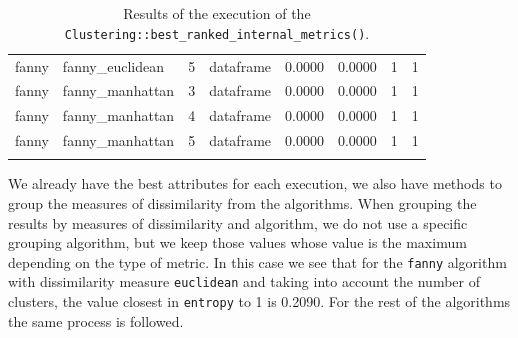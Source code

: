 {\begin{longtable}{| p{1cm} | p{1.8cm} | p{0.9cm} | p{1.1cm} | p{1.6cm} | p{0.8cm} | p{1.3cm} | p{1.8cm} |}
\scriptsize   fanny    & \scriptsize fanny\_euclidean & \scriptsize    5     & \scriptsize dataframe & \scriptsize    0.0000    & \scriptsize 0.0000 & \scriptsize    1     & \scriptsize        1 \\
\cline{2-8}
\scriptsize   fanny    & \scriptsize fanny\_manhattan & \scriptsize    3     & \scriptsize dataframe & \scriptsize    0.0000    & \scriptsize 0.0000 & \scriptsize    1     & \scriptsize        1 \\
\scriptsize   fanny    & \scriptsize fanny\_manhattan & \scriptsize    4     & \scriptsize dataframe & \scriptsize    0.0000    & \scriptsize 0.0000 & \scriptsize    1     & \scriptsize        1 \\
\scriptsize   fanny    & \scriptsize fanny\_manhattan & \scriptsize    5     & \scriptsize dataframe & \scriptsize    0.0000    & \scriptsize 0.0000 & \scriptsize    1     & \scriptsize        1 \\
\hline
\caption{Results of the execution of the \texttt{Clustering::best\_ranked\_internal\_metrics()}.}
\label{tab:clusteringbestrankedinternalmetrics}
\end{longtable}}


We already have the best attributes for each execution, we also have methods to group the measures of dissimilarity from the algorithms. When grouping the results by measures of dissimilarity and algorithm, we do not use a specific grouping algorithm, but we keep those values whose value is the maximum depending on the type of metric. In this case we see that for the \texttt{fanny} algorithm with dissimilarity measure \texttt{euclidean} and taking into account the number of clusters, the value closest in \texttt{entropy} to 1 is 0.2090. For the rest of the algorithms the same process is followed.

